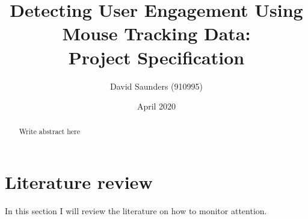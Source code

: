 \documentclass{article}
\title{Detecting User Engagement Using \\ Mouse Tracking Data:\\
    \large Project Specification
}
\author{David Saunders (910995)}
\date{April 2020}
\begin{document}
\maketitle

\begin{abstract} 
    Write abstract here
\end{abstract}

\tableofcontents






\section{Literature review}

In this section I will review the literature on how to monitor attention.

\end{document}
